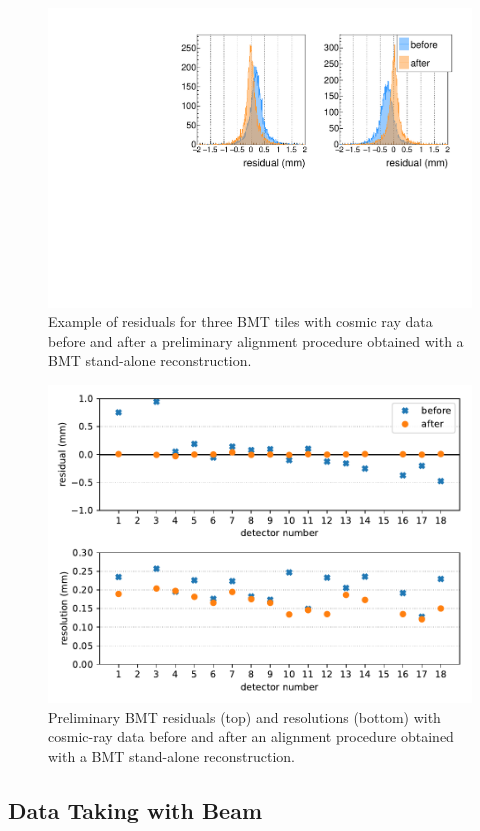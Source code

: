 \begin{figure}[htb]
 \includegraphics[width=.45\textwidth]{images/cosmic_residuals.pdf}
 \caption{Example of residuals for three BMT tiles with cosmic ray data before and after a preliminary alignment procedure
   obtained with a BMT stand-alone reconstruction.}
 \label{fig:mm-cosmic_residuals}
\end{figure}

\begin{figure}[htb]
 \includegraphics[width=\columnwidth]{images/residuals_and_resolutions.pdf}
 \caption{Preliminary BMT residuals (top) and resolutions (bottom) with cosmic-ray data before and after an alignment procedure
   obtained with a BMT stand-alone reconstruction.}
 \label{fig:mm-cosmic_res_summary}
\end{figure}

\subsection{Data Taking with Beam}

